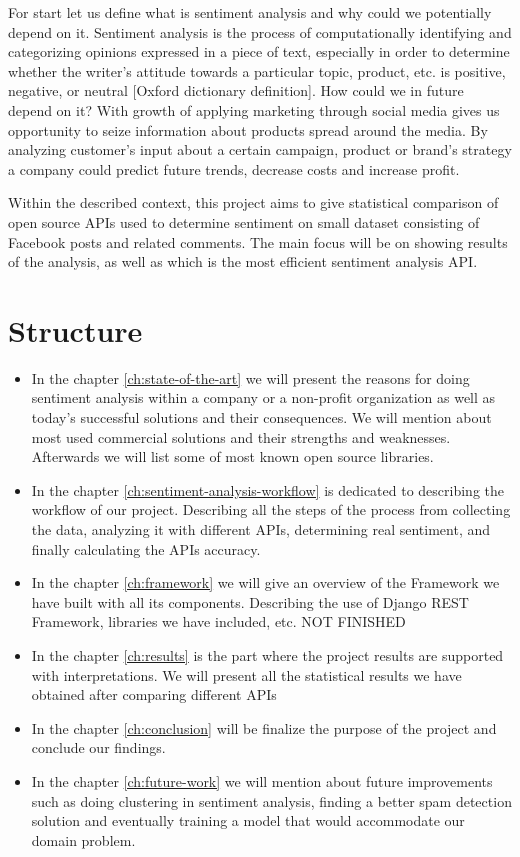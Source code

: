 	For start let us define what is sentiment analysis and why could we potentially depend on it. Sentiment analysis is the process of computationally identifying and categorizing opinions expressed in a piece of text, especially in order to determine whether the writer's attitude towards a particular topic, product, etc. is positive, negative, or neutral [Oxford dictionary definition]. How could we in future depend on it? With growth of applying marketing through social media gives us opportunity to seize information about products spread around the media. By analyzing customer's input about a certain campaign, product or brand's strategy a company could predict future trends, decrease costs and increase profit.
	
	Within the described context, this project aims to give statistical comparison of open source APIs used to determine sentiment on small dataset consisting of Facebook posts and related comments. The main focus will be on showing results of the analysis, as well as which is the most efficient sentiment analysis API.

\section{Structure}
\blindtext

\begin{itemize}
	\item 
	In the chapter \ref{ch:state-of-the-art}  we will present the reasons for doing sentiment analysis within a company or a non-profit organization as well as today's successful solutions and their consequences. We will mention about most used commercial solutions and their strengths and weaknesses. Afterwards we will list some of most known open source libraries.
	\item 
	In the chapter \ref{ch:sentiment-analysis-workflow} is dedicated to describing the workflow of our project. Describing all the steps of the process from collecting the data, analyzing it with different APIs, determining real sentiment, and finally calculating the APIs accuracy.
	\item 
	In the chapter \ref{ch:framework} we will give an overview of the Framework we have built with all its components. Describing the use of Django REST Framework, libraries we have included, etc. NOT FINISHED 
	\item 
	In the chapter \ref{ch:results} is the part where the project results are supported with interpretations. We will present all the statistical results we have obtained after comparing different APIs
	\item 
	In the chapter \ref{ch:conclusion} will be finalize the purpose of the project and conclude our findings.
	\item 
	In the chapter \ref{ch:future-work} we will mention about future improvements such as doing clustering in sentiment analysis, finding a better spam detection solution and eventually training a model that would accommodate our domain problem.

\end{itemize}